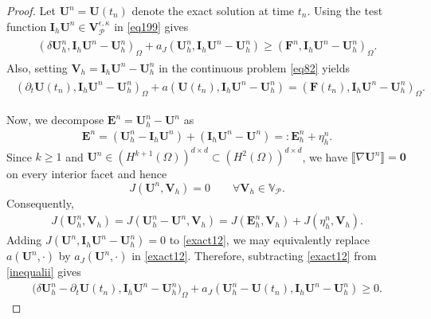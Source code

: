\documentclass[10pt,a4paper]{amsart}
\newcommand\bE{\mathbf{E}}
\newcommand\bU{\mathbf{U}}
\newcommand\bV{\mathbf{V}}
\newcommand\calP{{\mathcal{P}}}
\begin{document}
\begin{proof}
	Let $\mathbf{U}^n = \mathbf{U}(t_n)$ denote the exact solution at time $t_n$.
	Using the test function $\mathbf{I}_h \mathbf{U}^n\in \mathbf{V}_{\calP}^{\epsilon,\kappa}$ in \eqref{eq199} gives
	\begin{align}
		\begin{split}\label{inequalii}
			\left(\delta\mathbf{U}_h^n, \mathbf{I}_h\mathbf{U}^n - \mathbf{U}_h^n\right)_{\Omega}
			+  a_J(\mathbf{U}_h^{n}, \mathbf{I}_h\mathbf{U}^n - \mathbf{U}_h^n)
			\geq (\mathbf{F}^{n}, \mathbf{I}_h\mathbf{U}^n - \mathbf{U}_h^n)_{\Omega}.
		\end{split}
	\end{align}
	Also, setting $\mathbf{V}_h = \mathbf{I}_h \mathbf{U}^n - \mathbf{U}_h^n$ in the continuous problem \eqref{eq82} yields
	\begin{align}
		\begin{split}\label{exact12}
			\left(\partial_t\mathbf{U}(t_{n}), \mathbf{I}_h \mathbf{U}^n - \mathbf{U}_h^n\right)_{\Omega}
			+ a(\mathbf{U}(t_{n}), \mathbf{I}_h \mathbf{U}^n - \mathbf{U}_h^n)
			=(\mathbf{F}(t_{n}), \mathbf{I}_h \mathbf{U}^n - \mathbf{U}_h^n)_{\Omega}.
		\end{split}
	\end{align}

	Now, we decompose $\bE^{n}=\bU^{n}_{h}-\bU^{n}$ as
\begin{align}
	\bE^{n}=\left(\bU^{n}_{h}-\mathbf{I}_h \mathbf{U}^n\right)+\left(\mathbf{I}_{h}\bU^{n}-\bU^{n}\right)=:\bE^{n}_{h}+\eta^{n}_{h}.\label{error1}
\end{align}
Since $k\ge 1$ and $\bU^{n}\in (H^{k+1}(\Omega))^{d\times d}\subset (H^{2}(\Omega))^{d\times d}$, we have $\llbracket \nabla \bU^{n}\rrbracket=\mathbf 0$ on every interior facet and hence
\[
	J(\bU^{n},\bV_h)=0\qquad \forall \bV_h\in\mathbb V_{\calP}.
\]
Consequently,
\begin{align}
	J(\bU^{n}_{h}, \bV_{h})
	=J(\bU^{n}_{h}- \bU^{n}, \bV_{h})
	=J( \bE^{n}_{h}, \bV_{h})+J(\eta^{n}_{h}, \bV_{h}).\label{CIP12}
\end{align}
Adding $J(\bU^n,\mathbf I_h\bU^n-\bU_h^n)=0$ to \eqref{exact12}, we may equivalently replace $a(\bU^n,\cdot)$ by $a_J(\bU^n,\cdot)$ in \eqref{exact12}.
Therefore, subtracting \eqref{exact12} from \eqref{inequalii} gives
\begin{align}\label{subtraction}
	\Big(\delta\mathbf{U}_h^n - \partial_t\mathbf{U}(t_{n}), \mathbf{I}_h \mathbf{U}^n - \mathbf{U}_h^n\Big)_{\Omega}
	+ a_J(\bU_h^{n}-\bU(t_{n}), \mathbf{I}_h \mathbf{U}^n - \mathbf{U}_h^n)
	\geq 0.
\end{align}


\end{proof}
\end{document}
